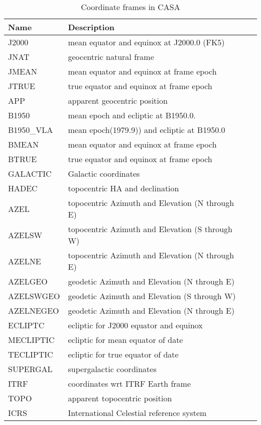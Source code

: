 \begin{table}[htb]
\caption{Coordinate frames in CASA \label{table:conv.coordinateframes}}
\begin{center}
\begin{tabular}{lll}
Name & Description\\
\hline
    J2000     &  mean equator and equinox at J2000.0 (FK5)\\
    JNAT      &  geocentric natural frame\\
    JMEAN     &  mean equator and equinox at frame epoch\\
    JTRUE     &  true equator and equinox at frame epoch\\
    APP       &  apparent geocentric position\\
    B1950     &  mean epoch and ecliptic at B1950.0.\\ 
    B1950\_VLA &  mean epoch(1979.9)) and ecliptic at B1950.0\\
    BMEAN     &  mean equator and equinox at frame epoch\\
    BTRUE     &  true equator and equinox at frame epoch\\
    GALACTIC  &  Galactic coordinates\\
    HADEC     &  topocentric HA and declination\\
    AZEL      &  topocentric Azimuth and Elevation (N through E)\\
    AZELSW    &  topocentric Azimuth and Elevation (S through W)\\
    AZELNE    &  topocentric Azimuth and Elevation (N through E)\\
    AZELGEO   &  geodetic Azimuth and Elevation (N through E)\\
    AZELSWGEO &  geodetic Azimuth and Elevation (S through W)\\
    AZELNEGEO &  geodetic Azimuth and Elevation (N through E)\\
    ECLIPTC   &  ecliptic for J2000 equator and equinox\\
    MECLIPTIC &  ecliptic for mean equator of date\\
    TECLIPTIC &  ecliptic for true equator of date\\
    SUPERGAL  &  supergalactic coordinates\\
    ITRF      &  coordinates wrt ITRF Earth frame\\
    TOPO      &  apparent topocentric position\\
    ICRS      &  International Celestial reference system\\ 
\end{tabular}
\end{center}
\end{table}

